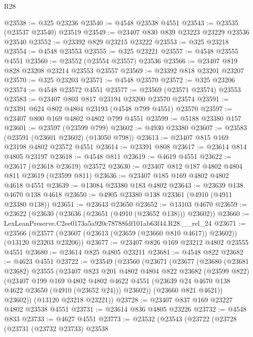 \begin{lexlean}{R28}
\begin{coremodule}
@23538 := @325 @23236
@23540 := @4548 @23538 @4551
@23543 := @23535 (@23537 @23540) @23519
@23549 := @23407 @830 @839 @23223 @23229 @23536 @23540
@23552 := @23392 @829 @23215 @23222
@23553 := @325 @23218
@23554 := @4548 @23553
@23555 := @325 @23221
@23557 := @4548 @23555 @4551
@23560 := @23552 (@23554 @23557) @23536
@23566 := @23407 @819 @828 @23208 @23214 @23553 @23557
@23569 := @23392 @818 @23201 @23207
@23570 := @325 @23203
@23571 := @4548 @23570
@23572 := @325 @23206
@23574 := @4548 @23572 @4551
@23577 := @23569 (@23571 @23574) @23553
@23583 := @23407 @803 @817 @23194 @23200 @23570 @23574
@23591 := @23391 @624 @802 @4804 @23193 (@4548 @799 @4551) @23570
@23597 := @23407 @800 @169 @4802 @4802 @799 @4551
@23599 := @5188 @23380 @157
@23601 := @23597 (@23599 @799)
@23602 := @4930 @23380
@23607 := @23583 (@23591 (@23601 @23602) (@13050 @798))
@23613 := @23407 @815 @169 @23198 @4802 @23572 @4551
@23614 := @23391 @808
@23617 := @23614 @814 @4805 @23197
@23618 := @4548 @811
@23619 := @4619 @4551
@23622 := @23617 (@23618 @23619) @23572
@23630 := @23407 @812 @187 @4802 @4804 @811 @23619 (@23599 @811)
@23636 := @23407 @185 @169 @4802 @4802 @4618 @4551
@23639 := @13084 @23380 @183 @4802
@23643 := @23639 @138 @4670 @138 @4618
@23650 := @4905 @23380 @138 @23361 (@4910 (@4911 @23380 @138))
@23651 := @23643 @23650
@23652 := @13103 @4670
@23659 := @23622 (@23630 (@23636 (@23651 (@4910 (@23652 @138))) @23602))
@23660 := LexLeanPreserve.C2ee0173a5a920c78788fdf101ab63f44.R28.__rel_24
@23671 := @23566
    (@23577 (@23607 (@23613 (@23659 (@23660 @810 @4617)) @23602)) (@13120 @23203 @23206))
@23677 := @23407 @826 @169 @23212 @4802 @23555 @4551
@23680 := @23614 @825 @4805 @23211
@23681 := @4548 @822
@23682 := @4623 @4551
@23722 := @23549
    (@23560
      (@23671
        (@23677
          (@23680
            (@23681 @23682)
            @23555
            (@23407
              @823
              @201
              @4802
              @4804
              @822
              @23682
              (@23599 @822)
              (@23407
                @199
                @169
                @4802
                @4802
                @4622
                @4551
                (@23639 @24 @4670 @138 @4622 @23650 (@4910 (@23652 @24)))
                @23602))
            (@23660 @821 @4621))
          @23602))
      (@13120 @23218 @23221))
@23728 := @23407 @837 @169 @23227 @4802 @23538 @4551
@23731 := @23614 @836 @4805 @23226
@23732 := @4548 @833
@23733 := @4627 @4551
@23773 := @23532
    (@23543
      (@23722
        (@23728
          (@23731
            (@23732 @23733)
            @23538

\end{coremodule}
\end{lexlean}
